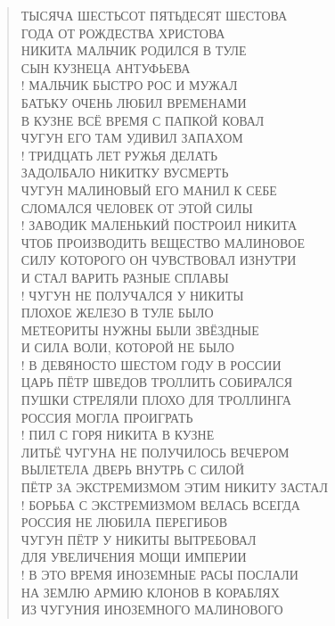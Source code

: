 \poemtitle{***}
\begin{verse}
ТЫСЯЧА ШЕСТЬСОТ ПЯТЬДЕСЯТ ШЕСТОВА\\
ГОДА ОТ РОЖДЕСТВА ХРИСТОВА\\
НИКИТА МАЛЬЧИК РОДИЛСЯ В ТУЛЕ\\
СЫН КУЗНЕЦА АНТУФЬЕВА\\!
МАЛЬЧИК БЫСТРО РОС И МУЖАЛ\\
БАТЬКУ ОЧЕНЬ ЛЮБИЛ ВРЕМЕНАМИ\\
В КУЗНЕ ВСЁ ВРЕМЯ С ПАПКОЙ КОВАЛ\\
ЧУГУН ЕГО ТАМ УДИВИЛ ЗАПАХОМ\\!
ТРИДЦАТЬ ЛЕТ РУЖЬЯ ДЕЛАТЬ\\
ЗАДОЛБАЛО НИКИТКУ ВУСМЕРТЬ\\
ЧУГУН МАЛИНОВЫЙ ЕГО МАНИЛ К СЕБЕ\\
СЛОМАЛСЯ ЧЕЛОВЕК ОТ ЭТОЙ СИЛЫ\\!
ЗАВОДИК МАЛЕНЬКИЙ ПОСТРОИЛ НИКИТА\\
ЧТОБ ПРОИЗВОДИТЬ ВЕЩЕСТВО МАЛИНОВОЕ\\
СИЛУ КОТОРОГО ОН ЧУВСТВОВАЛ ИЗНУТРИ\\
И СТАЛ ВАРИТЬ РАЗНЫЕ СПЛАВЫ\\!
ЧУГУН НЕ ПОЛУЧАЛСЯ У НИКИТЫ\\
ПЛОХОЕ ЖЕЛЕЗО В ТУЛЕ БЫЛО\\
МЕТЕОРИТЫ НУЖНЫ БЫЛИ ЗВЁЗДНЫЕ\\
И СИЛА ВОЛИ, КОТОРОЙ НЕ БЫЛО\\!
В ДЕВЯНОСТО ШЕСТОМ ГОДУ В РОССИИ\\
ЦАРЬ ПЁТР ШВЕДОВ ТРОЛЛИТЬ СОБИРАЛСЯ\\
ПУШКИ СТРЕЛЯЛИ ПЛОХО ДЛЯ ТРОЛЛИНГА\\
РОССИЯ МОГЛА ПРОИГРАТЬ\\!
ПИЛ С ГОРЯ НИКИТА В КУЗНЕ\\
ЛИТЬЁ ЧУГУНА НЕ ПОЛУЧИЛОСЬ ВЕЧЕРОМ\\
ВЫЛЕТЕЛА ДВЕРЬ ВНУТРЬ С СИЛОЙ\\
ПЁТР ЗА ЭКСТРЕМИЗМОМ ЭТИМ НИКИТУ ЗАСТАЛ\\!
БОРЬБА С ЭКСТРЕМИЗМОМ ВЕЛАСЬ ВСЕГДА\\
РОССИЯ НЕ ЛЮБИЛА ПЕРЕГИБОВ\\
ЧУГУН ПЁТР У НИКИТЫ ВЫТРЕБОВАЛ\\
ДЛЯ УВЕЛИЧЕНИЯ МОЩИ ИМПЕРИИ\\!
В ЭТО ВРЕМЯ ИНОЗЕМНЫЕ РАСЫ ПОСЛАЛИ\\
НА ЗЕМЛЮ АРМИЮ КЛОНОВ В КОРАБЛЯХ\\
ИЗ ЧУГУНИЯ ИНОЗЕМНОГО МАЛИНОВОГО\\

\end{verse}
